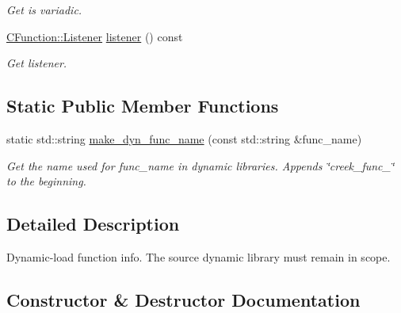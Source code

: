 \begin{DoxyCompactItemize}
\begin{DoxyCompactList}\small\item\em Get is variadic. \end{DoxyCompactList}\item 
\hyperlink{classcreek_1_1_c_function_a9499b5501ecc59d9ef8d892991c8fa16}{C\+Function\+::\+Listener} \hyperlink{classcreek_1_1_dyn_func_ad7a8723180e6b47ed5149cd57b9d8046}{listener} () const \hypertarget{classcreek_1_1_dyn_func_ad7a8723180e6b47ed5149cd57b9d8046}{}\label{classcreek_1_1_dyn_func_ad7a8723180e6b47ed5149cd57b9d8046}

\begin{DoxyCompactList}\small\item\em Get listener. \end{DoxyCompactList}\end{DoxyCompactItemize}
\subsection*{Static Public Member Functions}
\begin{DoxyCompactItemize}
\item 
static std\+::string \hyperlink{classcreek_1_1_dyn_func_a805b2db969d7d9ef1cba7a67ffc8da66}{make\+\_\+dyn\+\_\+func\+\_\+name} (const std\+::string \&func\+\_\+name)\hypertarget{classcreek_1_1_dyn_func_a805b2db969d7d9ef1cba7a67ffc8da66}{}\label{classcreek_1_1_dyn_func_a805b2db969d7d9ef1cba7a67ffc8da66}

\begin{DoxyCompactList}\small\item\em Get the name used for {\ttfamily func\+\_\+name} in dynamic libraries. Appends {\ttfamily \char`\"{}creek\+\_\+func\+\_\+\char`\"{}} to the beginning. \end{DoxyCompactList}\end{DoxyCompactItemize}


\subsection{Detailed Description}
Dynamic-\/load function info. The source dynamic library must remain in scope. 

\subsection{Constructor \& Destructor Documentation}

